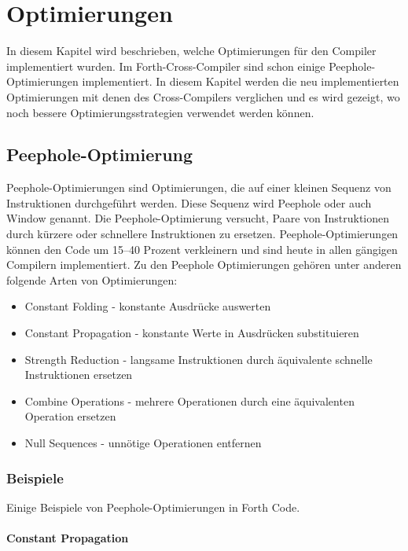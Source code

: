 \chapter{Optimierungen}
\label{chap:optimizer}
In diesem Kapitel wird beschrieben, welche Optimierungen für den Compiler implementiert wurden. Im Forth-Cross-Compiler sind schon einige Peephole-Optimierungen implementiert. In diesem Kapitel werden die neu implementierten Optimierungen mit denen des Cross-Compilers verglichen und es wird gezeigt, wo noch bessere Optimierungsstrategien verwendet werden können.

\section{Peephole-Optimierung}

Peephole-Optimierungen sind Optimierungen, die auf einer kleinen Sequenz von Instruktionen durchgeführt werden. Diese Sequenz wird Peephole oder auch Window genannt. Die Peephole-Optimierung versucht, Paare von Instruktionen durch kürzere oder schnellere Instruktionen zu ersetzen.\cite{peepwiki} Peephole-Optimierungen können den Code um 15--40 Prozent verkleinern und sind heute in allen gängigen Compilern implementiert.\cite{peepdavidson} Zu den Peephole Optimierungen gehören unter anderen folgende Arten von Optimierungen:

\begin{itemize} 
	\item Constant Folding - konstante Ausdrücke auswerten
	\item Constant Propagation - konstante Werte in Ausdrücken substituieren
	\item Strength Reduction - langsame Instruktionen durch äquivalente schnelle Instruktionen ersetzen
	\item Combine Operations - mehrere Operationen durch eine äquivalenten Operation ersetzen
	\item Null Sequences - unnötige Operationen entfernen\cite{peepwiki}
\end{itemize}

\newpage

\subsection{Beispiele}

Einige Beispiele von Peephole-Optimierungen in Forth Code.

\subsubsection{Constant Propagation}
\label{constantprogationsection}


